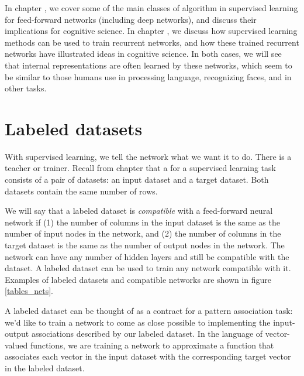 In chapter , we cover some of the main classes of algorithm in supervised learning for feed-forward networks (including deep networks), and discuss their implications for cognitive science. In chapter , we discuss how supervised learning methods can be used to train recurrent networks, and how these trained recurrent networks have illustrated ideas in cognitive science. In both cases, we will see that internal representations are often learned by these networks, which seem to be similar to those humans use in processing language, recognizing faces, and in other tasks. 


\section{Labeled datasets}\label{supervised_datasets}

With supervised learning, we tell the network what we want it to do. There is a teacher or trainer. Recall from chapter  that a  for a supervised learning task consists of a pair of datasets: an input dataset and a target dataset. Both datasets contain the same number of rows.

We will say that a labeled dataset is \emph{compatible} with a feed-forward neural network if (1) the number of columns in the input dataset is the same as the number of input nodes in the network, and (2) the number of columns in the target dataset is the same as the number of output nodes in the network. The network can have any number of hidden layers and still be compatible with the dataset. A labeled dataset can be used to train any network compatible with it. Examples of labeled datasets and compatible networks are shown in figure \ref{tables_nets}. 

A labeled dataset can be thought of as a contract for a pattern association task: we'd like to train a network to come as close possible to implementing the input-output associations described by our labeled dataset. In the language of vector-valued functions, we are training a network to approximate a function that associates each vector in the input dataset with the corresponding target vector in the labeled dataset.

